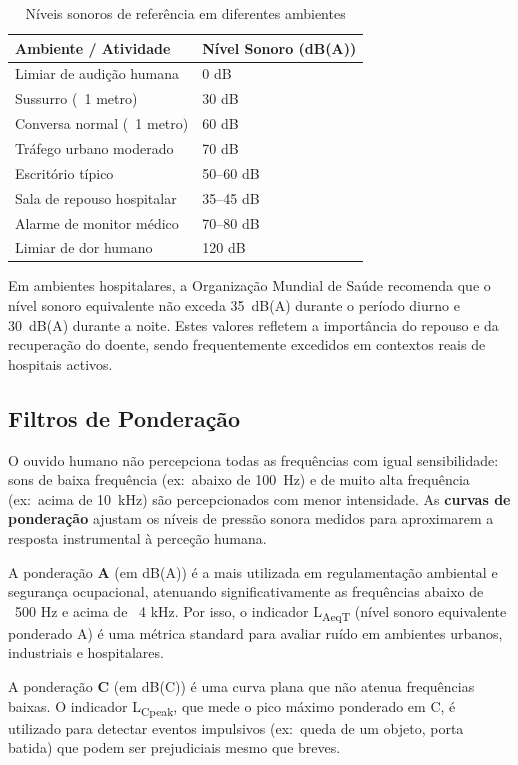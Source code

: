 \documentclass[12pt,a4paper]{report}
\begin{document}
\begin{table}[H]
\centering\small
\caption{Níveis sonoros de referência em diferentes ambientes}
\label{tab:niveis_sonoros}
\begin{tabular}{ll}
\toprule
\textbf{Ambiente / Atividade} & \textbf{Nível Sonoro (dB(A))} \\
\midrule
Limiar de audição humana & 0 dB \\
Sussurro (~1 metro) & 30 dB \\
Conversa normal (~1 metro) & 60 dB \\
Tráfego urbano moderado & 70 dB \\
Escritório típico & 50--60 dB \\
Sala de repouso hospitalar & 35--45 dB \\
Alarme de monitor médico & 70--80 dB \\
Limiar de dor humano & 120 dB \\
\bottomrule
\end{tabular}
\end{table}

Em ambientes hospitalares, a Organização Mundial de Saúde recomenda que o nível sonoro equivalente não exceda 35~dB(A) durante o período diurno e 30~dB(A) durante a noite. Estes valores refletem a importância do repouso e da recuperação do doente, sendo frequentemente excedidos em contextos reais de hospitais activos.

\subsection{Filtros de Ponderação}

O ouvido humano não percepciona todas as frequências com igual sensibilidade: sons de baixa frequência (ex:~abaixo de 100~Hz) e de muito alta frequência (ex:~acima de 10~kHz) são percepcionados com menor intensidade. As \textbf{curvas de ponderação} ajustam os níveis de pressão sonora medidos para aproximarem a resposta instrumental à perceção humana.

A ponderação \textbf{A} (em dB(A)) é a mais utilizada em regulamentação ambiental e segurança ocupacional, atenuando significativamente as frequências abaixo de ~500 Hz e acima de ~4 kHz. Por isso, o indicador L\textsubscript{AeqT} (nível sonoro equivalente ponderado A) é uma métrica standard para avaliar ruído em ambientes urbanos, industriais e hospitalares.

A ponderação \textbf{C} (em dB(C)) é uma curva plana que não atenua frequências baixas. O indicador L\textsubscript{Cpeak}, que mede o pico máximo ponderado em C, é utilizado para detectar eventos impulsivos (ex:~queda de um objeto, porta batida) que podem ser prejudiciais mesmo que breves.
\end{document}

